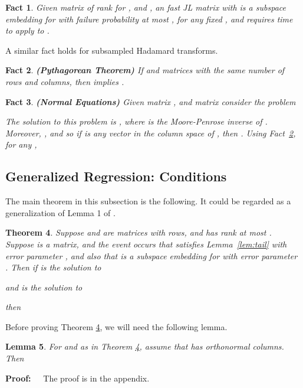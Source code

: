 \documentclass{sig-alternate}
\newtheorem{theorem}{Theorem}
\newtheorem{lemma}[theorem]{Lemma}
\newtheorem{fact}[theorem]{Fact}
\def\FullBox{\hbox{\vrule width 8pt height 8pt depth 0pt}}
\def\qed{\ifmmode\qquad\FullBox\else{\unskip\nobreak\hfil
\penalty50\hskip1em\null\nobreak\hfil\FullBox
\parfillskip=0pt\finalhyphendemerits=0\endgraf}\fi}
\newenvironment{proof}{\begin{trivlist} \item {\bf Proof:~~}}
  {\qed\end{trivlist}}
\begin{document}
\begin{fact}\label{fact:subspace jl}
Given  matrix  of rank  for
, and , an 
fast JL matrix  with 
is a subspace embedding for  with failure probability at most ,
for any fixed ,
and requires  time to apply to .
\end{fact}

A similar fact holds for subsampled Hadamard transforms.

\begin{fact}\label{fact:pyth}{\bf (Pythagorean Theorem)}
If  and  matrices with the same number of rows and columns,
then  implies .
\end{fact}

\begin{fact}\label{fact:normal}{\bf (Normal Equations)}
Given  matrix , and  matrix
 consider the problem

The solution to this problem is , where  is the Moore-Penrose
inverse of .  Moreover, , and so
if  is any vector in the column space of ,
then . Using Fact~\ref{fact:pyth}, for any ,

\end{fact}
\fi 

\subsection{Generalized Regression: Conditions}

The main theorem in this subsection is the following. It could be regarded as a
generalization of Lemma 1 of \cite{dmms11}.
\begin{theorem}\label{thm:genReg}
Suppose  and  are matrices with  rows,
and  has rank at most .
Suppose
 is a  matrix,
and the event occurs that  satisfies Lemma~\ref{lem:tail} with error
parameter ,
and also that
 is a subspace embedding for  with 
error parameter .
Then
if  is the solution to

and  is the solution to

then

\end{theorem}
\ifSTOC\else
Before proving Theorem \ref{thm:genReg}, we will need the following lemma.  
\begin{lemma}\label{lem:betabound}
For  and  as in Theorem \ref{thm:genReg},
assume that  has orthonormal columns. Then

\end{lemma}

\begin{proof} The proof is in the appendix.\end{proof}
\fi 
\end{document}
